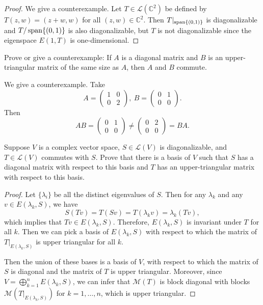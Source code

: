 \documentclass{article}
\begin{document}
\begin{proof}
  We give a counterexample. Let \( T \in \mathcal{L}(\mathbb{C}^2) \) be defined by \( T(z,w)=(z+w, w) \) for all \( (z,w)\in\mathbb{C}^2 \). Then \( T|_{\operatorname{span}\{(0,1)\}} \) is diagonalizable and \( T/\operatorname{span}\{(0,1)\} \) is also diagonalizable, but \( T \) is not diagonalizable since the eigenspace \( E(1,T) \) is one-dimensional.
\end{proof}



\begin{problem}[5E-4]
Prove or give a counterexample: If $A$ is a diagonal matrix and $B$ is an upper-triangular matrix of the same size as $A$, then $A$ and $B$ commute.
\end{problem}

\begin{solution}
  We give a counterexample. Take
  \[ A=\begin{pmatrix}
    1 & 0 \\
    0 & 2
  \end{pmatrix},\ B=\begin{pmatrix}
    0 & 1 \\
    0 & 0
  \end{pmatrix}. \]
  Then 
  \[ AB=\begin{pmatrix}
    0 & 1 \\
    0 & 0
  \end{pmatrix}\neq\begin{pmatrix}
    0 & 2 \\
    0 & 0
  \end{pmatrix}=BA. \]
\end{solution}



\begin{problem}[5E-7]
Suppose $V$ is a complex vector space, $S \in \mathcal{L}(V)$ is diagonalizable, and $T \in \mathcal{L}(V)$ commutes with $S$. Prove that there is a basis of $V$ such that $S$ has a diagonal matrix with respect to this basis and $T$ has an upper-triangular matrix with respect to this basis.
\end{problem}

\begin{proof}
  Let \( \{\lambda_i\} \) be all the distinct eigenvalues of \( S \). Then for any \( \lambda_k \) and any \( v\in E(\lambda_k,S) \), we have
  \[ S(Tv)=T(Sv)=T(\lambda_k v)=\lambda_k (Tv), \]
  which implies that \( Tv\in E(\lambda_k,S) \). Therefore, \( E(\lambda_k,S) \) is invariant under \( T \) for all \( k \). Then we can pick a basis of \( E(\lambda_k,S) \) with respect to which the matrix of \( T|_{E(\lambda_k,S)} \) is upper triangular for all \( k \). \par
  Then the union of these bases is a basis of \( V \), with respect to which the matrix of \( S \) is diagonal and the matrix of \( T \) is upper triangular. Moreover, since \( V=\bigoplus_{k=1}^{n} E(\lambda_k,S) \), we can infer that \( \mathcal{M}(T) \) is block diagonal with blocks \( \mathcal{M}(T|_{E(\lambda_k,S)}) \) for \( k=1,\dots,n \), which is upper triangular. 
\end{proof}
\end{document}
